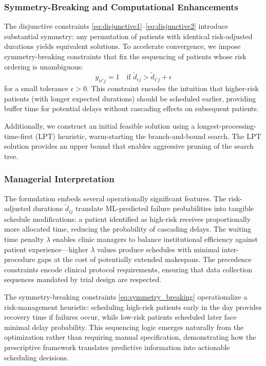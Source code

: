 \documentclass[11pt,a4paper]{article}
\begin{document}
\subsubsection{Symmetry-Breaking and Computational Enhancements}

The disjunctive constraints \eqref{eq:disjunctive1}--\eqref{eq:disjunctive2} introduce substantial symmetry: any permutation of patients with identical risk-adjusted durations yields equivalent solutions. To accelerate convergence, we impose symmetry-breaking constraints that fix the sequencing of patients whose risk ordering is unambiguous:
\begin{equation}
y_{ii'j} = 1 \quad \text{if } \tilde{d}_{ij} > \tilde{d}_{i'j} + \epsilon
\label{eq:symmetry_breaking}
\end{equation}
for a small tolerance $\epsilon > 0$. This constraint encodes the intuition that higher-risk patients (with longer expected durations) should be scheduled earlier, providing buffer time for potential delays without cascading effects on subsequent patients.

Additionally, we construct an initial feasible solution using a longest-processing-time-first (LPT) heuristic, warm-starting the branch-and-bound search. The LPT solution provides an upper bound that enables aggressive pruning of the search tree.

\subsubsection{Managerial Interpretation}

The formulation embeds several operationally significant features. The risk-adjusted durations $\tilde{d}_{ij}$ translate ML-predicted failure probabilities into tangible schedule modifications: a patient identified as high-risk receives proportionally more allocated time, reducing the probability of cascading delays. The waiting time penalty $\lambda$ enables clinic managers to balance institutional efficiency against patient experience---higher $\lambda$ values produce schedules with minimal inter-procedure gaps at the cost of potentially extended makespans. The precedence constraints encode clinical protocol requirements, ensuring that data collection sequences mandated by trial design are respected.

The symmetry-breaking constraints \eqref{eq:symmetry_breaking} operationalize a risk-management heuristic: scheduling high-risk patients early in the day provides recovery time if failures occur, while low-risk patients scheduled later face minimal delay probability. This sequencing logic emerges naturally from the optimization rather than requiring manual specification, demonstrating how the prescriptive framework translates predictive information into actionable scheduling decisions.
\end{document}
